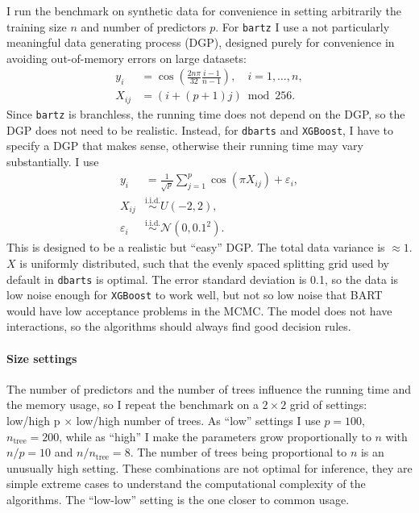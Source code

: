 \documentclass{article}
\let\oldmarginpar\marginpar
\renewcommand{\marginpar}[1]{\oldmarginpar{\sffamily\scriptsize #1}}
\renewcommand{\marginpar}[1]{\relax} %
\begin{document}
    I run the benchmark on synthetic data for convenience in setting arbitrarily the training size $n$ and number of predictors $p$. For \texttt{bartz} I use a not particularly meaningful data generating process (DGP), designed purely for convenience in avoiding out-of-memory errors on large datasets:
    \begin{align}
        y_i &= \cos\left( \frac{2n\pi}{32} \frac{i-1}{n-1} \right), \quad i = 1,\ldots, n, \\
        X_{ij} &= (i + (p+1)j) \bmod 256.
    \end{align}
    Since \texttt{bartz} is branchless, the running time does not depend on the DGP, so the DGP does not need to be realistic. Instead, for \texttt{dbarts} and \texttt{XGBoost}, I have to specify a DGP that makes sense, otherwise their running time may vary substantially. I use
    \begin{align}
        y_i &= \frac1{\sqrt p}\sum_{j=1}^p \cos(\pi X_{ij}) + \varepsilon_i, \\
        X_{ij} &\overset{\mathrm{i.i.d.}}{\sim} U(-2, 2), \\
        \varepsilon_i &\overset{\mathrm{i.i.d.}}{\sim} \mathcal N(0, 0.1^2).
    \end{align}
    This is designed to be a realistic but ``easy'' DGP. The total data variance is $\approx 1$. $X$ is uniformly distributed, such that the evenly spaced splitting grid used by default in \texttt{dbarts} is optimal. The error standard deviation is 0.1, so the data is low noise enough for \texttt{XGBoost} to work well, but not so low noise that BART would have low acceptance problems in the MCMC. The model does not have interactions, so the algorithms should always find good decision rules.

    \paragraph{Size settings}

    The number of predictors and the number of trees influence the running time and the memory usage, so I repeat the benchmark on a $2\times 2$ grid of settings: low/high p $\times$ low/high number of trees. As ``low'' settings I use $p=100$, $n_\text{tree} = 200$, while as ``high'' I make the parameters grow proportionally to $n$ with $n/p = 10$ and $n/n_\text{tree}=8$. The number of trees being proportional to $n$ is an unusually high setting.\marginpar{This number of trees probably is too crazy high for XGBoost. I don't know how to set it sensibly. It shouldn't stay constant either.} These combinations are not optimal for inference, they are simple extreme cases to understand the computational complexity of the algorithms. The ``low-low'' setting is the one closer to common usage.
\end{document}
